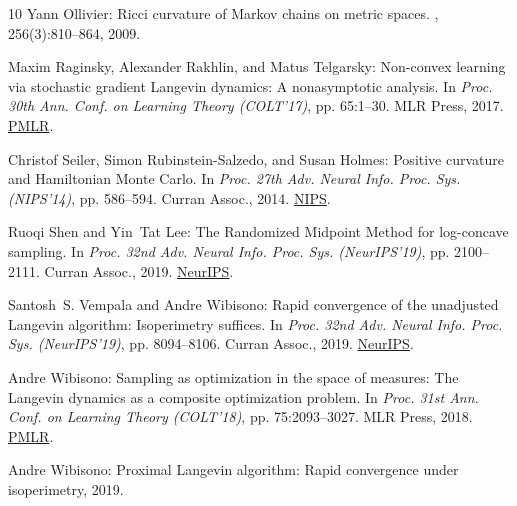 \begin{thebibliography}{10}
{\sc Yann Ollivier}: Ricci curvature of {M}arkov chains on metric spaces.
, 256(3):810--864, 2009.

{\sc Maxim Raginsky, Alexander Rakhlin, and Matus Telgarsky}: Non-convex
  learning via stochastic gradient {L}angevin dynamics: {A} nonasymptotic
  analysis.
\newblock In {\em Proc. 30th Ann. Conf. on Learning Theory (COLT'17)}, pp.
  65:1--30. MLR Press, 2017.
\newblock \href{http://proceedings.mlr.press/v65/raginsky17a.html}{PMLR}.

{\sc Christof Seiler, Simon Rubinstein-Salzedo, and Susan Holmes}: Positive
  curvature and {H}amiltonian {M}onte {C}arlo.
\newblock In {\em Proc. 27th Adv. Neural Info. Proc. Sys. (NIPS'14)}, pp.
  586--594. Curran Assoc., 2014.
\newblock
  \href{https://papers.nips.cc/paper/2014/hash/beed13602b9b0e6ecb5b568ff5058f07-Abstract.html}{NIPS}.

{\sc Ruoqi Shen and Yin~Tat Lee}: The {R}andomized {M}idpoint {M}ethod for
  log-concave sampling.
\newblock In {\em Proc. 32nd Adv. Neural Info. Proc. Sys. (NeurIPS'19)}, pp.
  2100--2111. Curran Assoc., 2019.
\newblock
  \href{https://proceedings.neurips.cc/paper/2019/hash/eb86d510361fc23b59f18c1bc9802cc6-Abstract.html}{NeurIPS}.

{\sc Santosh~S. Vempala and Andre Wibisono}: Rapid convergence of the
  unadjusted {L}angevin algorithm: {I}soperimetry suffices.
\newblock In {\em Proc. 32nd Adv. Neural Info. Proc. Sys. (NeurIPS'19)}, pp.
  8094--8106. Curran Assoc., 2019.
\newblock
  \href{https://proceedings.neurips.cc/paper/2019/hash/65a99bb7a3115fdede20da98b08a370f-Abstract.html}{NeurIPS}.

{\sc Andre Wibisono}: Sampling as optimization in the space of measures: {T}he
  {L}angevin dynamics as a composite optimization problem.
\newblock In {\em Proc. 31st Ann. Conf. on Learning Theory (COLT'18)}, pp.
  75:2093--3027. MLR Press, 2018.
\newblock \href{http://proceedings.mlr.press/v75/wibisono18a.html}{PMLR}.

{\sc Andre Wibisono}: Proximal {L}angevin algorithm: {R}apid convergence under
  isoperimetry, 2019.


\end{thebibliography}
